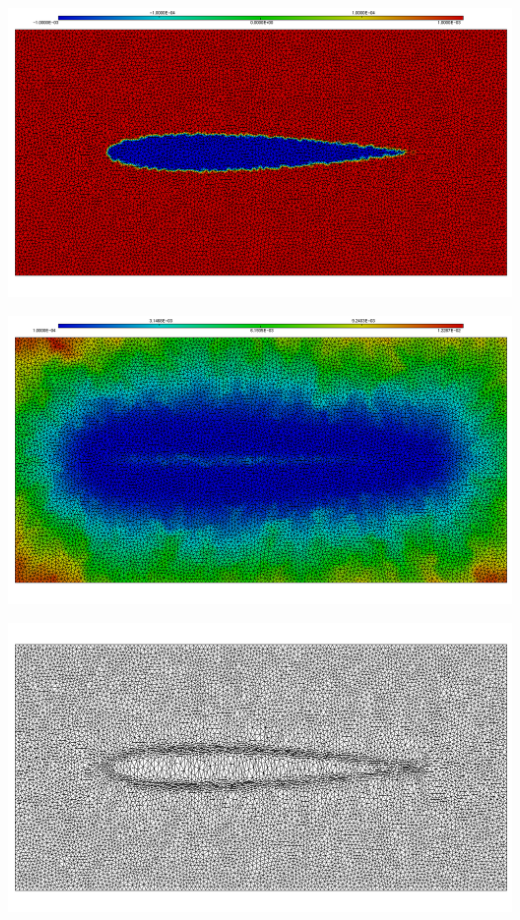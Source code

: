 \begingroup
	\begin{minipage}[t]{.5\linewidth}
		\centering
		\includegraphics[scale=.15]{Bordeaux/figures/metLSNacaLS.png}
	\end{minipage}
	\hfill
	\begin{minipage}[t]{.5\linewidth}
		\centering
		\includegraphics[scale=.15]{Bordeaux/figures/metLSNacaMet.png}
	\end{minipage}	
	\begin{minipage}[t]{1.\linewidth}
		\centering
		\includegraphics[scale=.2]{Bordeaux/figures/metLSNacaAdapt.png}
	\end{minipage}	
\endgroup


